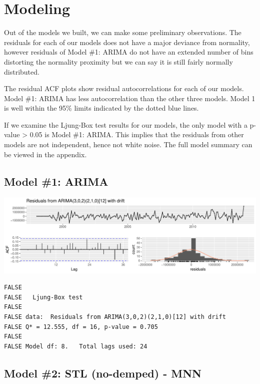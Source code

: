 \documentclass[openany]{book}
\begin{document}
\hypertarget{modeling-1}{%
\section{Modeling}\label{modeling-1}}

Out of the models we built, we can make some preliminary observations.
The residuals for each of our models does not have a major deviance from
normality, however residuals of Model \#1: ARIMA do not have an extended
number of bins distorting the normality proximity but we can say it is
still fairly normally distributed.

The residual ACF plots show residual autocorrelations for each of our
models. Model \#1: ARIMA has less autocorrelation than the other three
models. Model 1 is well within the 95\% limits indicated by the dotted
blue lines.

If we examine the Ljung-Box test results for our models, the only model
with a p-value \textgreater{} 0.05 is Model \#1: ARIMA. This implies
that the residuals from other models are not independent, hence not
white noise. The full model summary can be viewed in the appendix.

\hypertarget{model-1-arima}{%
\subsection{Model \#1: ARIMA}\label{model-1-arima}}

\includegraphics{Group2_Project1_Fall2019_files/figure-latex/unnamed-chunk-11-1.pdf}

\begin{verbatim}
FALSE 
FALSE   Ljung-Box test
FALSE 
FALSE data:  Residuals from ARIMA(3,0,2)(2,1,0)[12] with drift
FALSE Q* = 12.555, df = 16, p-value = 0.705
FALSE 
FALSE Model df: 8.   Total lags used: 24
\end{verbatim}

\hypertarget{model-2-stl-no-demped---mnn}{%
\subsection{Model \#2: STL (no-demped) -
MNN}\label{model-2-stl-no-demped---mnn}}
\end{document}
